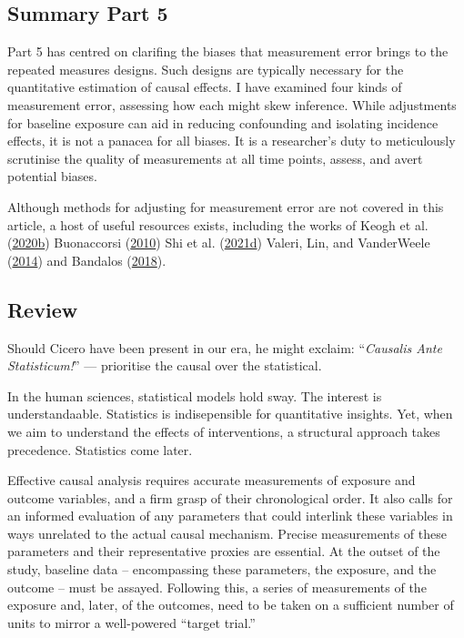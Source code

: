 \documentclass[
  singlecolumn]{report}
\begin{document}
\hypertarget{summary-part-5}{%
\subsection{Summary Part 5}\label{summary-part-5}}

Part 5 has centred on clarifing the biases that measurement error brings
to the repeated measures designs. Such designs are typically necessary
for the quantitative estimation of causal effects. I have examined four
kinds of measurement error, assessing how each might skew inference.
While adjustments for baseline exposure can aid in reducing confounding
and isolating incidence effects, it is not a panacea for all biases. It
is a researcher's duty to meticulously scrutinise the quality of
measurements at all time points, assess, and avert potential biases.

Although methods for adjusting for measurement error are not covered in
this article, a host of useful resources exists, including the works of
Keogh et al. (\protect\hyperlink{ref-keogh2020}{2020b}) Buonaccorsi
(\protect\hyperlink{ref-buonaccorsi2010}{2010}) Shi et al.
(\protect\hyperlink{ref-shi2021b}{2021d}) Valeri, Lin, and VanderWeele
(\protect\hyperlink{ref-valeri2014}{2014}) and Bandalos
(\protect\hyperlink{ref-bandalos2018}{2018}).

\hypertarget{review}{%
\subsection{Review}\label{review}}

Should Cicero have been present in our era, he might exclaim:
``\emph{Causalis Ante Statisticum!}'' --- prioritise the causal over the
statistical.

In the human sciences, statistical models hold sway. The interest is
understandaable. Statistics is indisepensible for quantitative insights.
Yet, when we aim to understand the effects of interventions, a
structural approach takes precedence. Statistics come later.

Effective causal analysis requires accurate measurements of exposure and
outcome variables, and a firm grasp of their chronological order. It
also calls for an informed evaluation of any parameters that could
interlink these variables in ways unrelated to the actual causal
mechanism. Precise measurements of these parameters and their
representative proxies are essential. At the outset of the study,
baseline data -- encompassing these parameters, the exposure, and the
outcome -- must be assayed. Following this, a series of measurements of
the exposure and, later, of the outcomes, need to be taken on a
sufficient number of units to mirror a well-powered ``target trial.''
\end{document}
